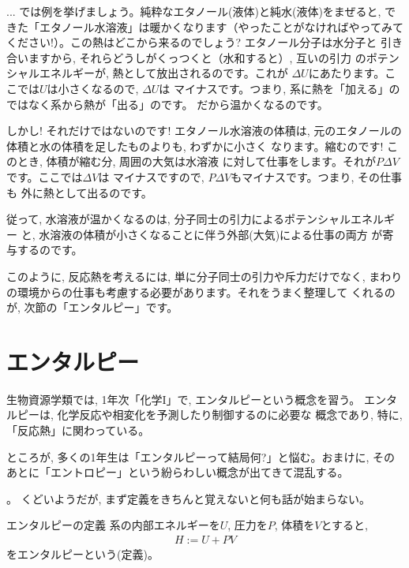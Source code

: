 \begin{faq}{\small{}
 ... では例を挙げましょう。純粋なエタノール(液体)と純水(液体)をまぜると, 
できた「エタノール水溶液」は暖かくなります（やったことがなければやってみて
ください!）。この熱はどこから来るのでしょう? エタノール分子は水分子と
引き合いますから, それらどうしがくっつくと（水和すると）, 互いの引力
のポテンシャルエネルギーが, 熱として放出されるのです。これが
$\Delta U$にあたります。ここでは$U$は小さくなるので, $\Delta U$は
マイナスです。つまり, 系に熱を「加える」のではなく系から熱が「出る」のです。
だから温かくなるのです。

しかし! それだけではないのです! エタノール水溶液の体積は, 
元のエタノールの体積と水の体積を足したものよりも, わずかに小さく
なります。縮むのです! このとき, 体積が縮む分, 周囲の大気は水溶液
に対して仕事をします。それが$P\Delta V$です。ここでは$\Delta V$は
マイナスですので, $P\Delta V$もマイナスです。つまり, その仕事も
外に熱として出るのです。

従って, 水溶液が温かくなるのは, 分子同士の引力によるポテンシャルエネルギー
と, 水溶液の体積が小さくなることに伴う外部(大気)による仕事の両方
が寄与するのです。

このように, 反応熱を考えるには, 単に分子同士の引力や斥力だけでなく, 
まわりの環境からの仕事も考慮する必要があります。それをうまく整理して
くれるのが, 次節の「エンタルピー」です。}\end{faq}\mv


\section{エンタルピー}

生物資源学類では, 1年次「化学I」で, エンタルピーという概念を習う。
エンタルピーは, 化学反応や相変化を予測したり制御するのに必要な
概念であり, 特に, 「反応熱」に関わっている。

ところが, 多くの1年生は「エンタルピーって結局何?」と悩む。おまけに, 
そのあとに「エントロピー」という紛らわしい概念が出てきて混乱する。

。
くどいようだが, まず定義をきちんと覚えないと何も話が始まらない。
\begin{itembox}{エンタルピーの定義}
系の内部エネルギーを$U$, 圧力を$P$, 体積を$V$とすると, 
\begin{eqnarray}
H:=U+PV\label{eq:def_enthalpy}
\end{eqnarray}
をエンタルピーという(定義)。
\end{itembox}

